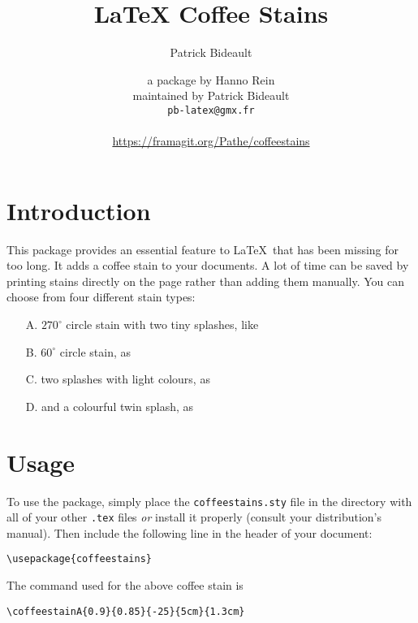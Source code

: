 \documentclass[a4paper, 11pt, BCOR = 0 pt, oneside, english]{scrartcl}
\author{Patrick Bideault}
\begin{document}
\title{LaTeX Coffee Stains}
\author{a package by Hanno Rein\\
  maintained by Patrick Bideault\\
  \texttt{pb-latex@gmx.fr}\\
  ~\\
  \url{https://framagit.org/Pathe/coffeestains}}
\renewcommand{\today}{version \gitRel{} -- \DTMtoday{}}
\maketitle

\label{stainA}
\section{Introduction}
This package provides an essential feature to \LaTeX~that has been missing for
too long. It adds a coffee stain to your documents. A lot of time can be saved
by printing stains directly on the page rather than adding them manually. You can
choose from four different stain types:
\begin{itemize}
\item[A.] $270^\circ$ circle stain with two tiny splashes, like 
  \item[B.] $60^\circ$ circle stain, as 
  \item[C.] two splashes with light colours, as 
  \item[D.] and a colourful twin splash, as 
\end{itemize}

\section{Usage}
To use the package, simply place the \texttt{coffeestains.sty} file in the directory with all of your 
other \texttt{.tex} files \textit{or} install it properly (consult your distribution's manual). 
Then include the following line in the header of your document:
\begin{verbatim}
\usepackage{coffeestains}
\end{verbatim}

\vfill{}

\begin{tcolorbox}
  The command used for the above coffee stain is

  \verb|\coffeestainA{0.9}{0.85}{-25}{5cm}{1.3cm}|
\end{tcolorbox}
\newpage{}
\label{stainC}
\end{document}

